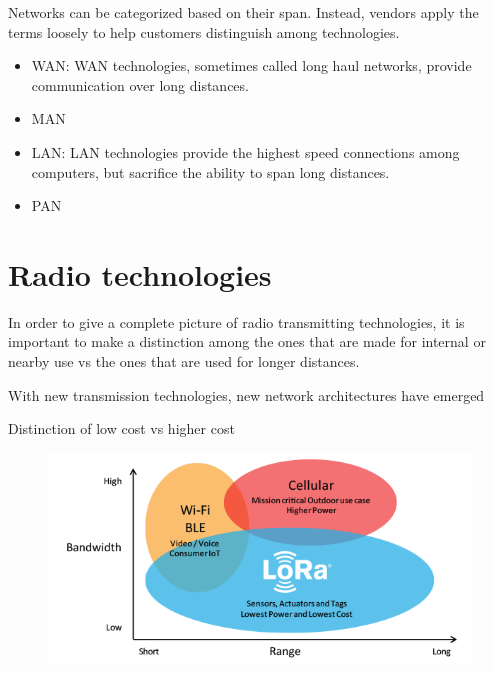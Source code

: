 	Networks can be categorized based on their span.
	Instead, vendors apply the terms loosely to help customers distinguish among technologies.
	\begin{itemize}
		\item WAN: WAN technologies, sometimes called long haul networks, provide communication
		over long distances.
		\item MAN
		\item LAN: 	LAN technologies provide the highest speed connections among computers, but
		sacrifice the ability to span long distances.
		\item PAN
	\end{itemize}
	
	
	\newpage	

\section{Radio technologies}\label{sec:section_two}
	
	In order to give a complete picture of radio transmitting technologies, it is important to make a distinction among the ones that are made for internal or nearby use vs the ones that are used for longer distances.
	
	
	With new transmission technologies, new network architectures have emerged
	
	
	Distinction of low cost vs higher cost
	
	\begin{figure}
		\centering
		\includegraphics[width=\textwidth]{resources/img/LoRa_Why_Range}
		\caption{}
	\end{figure}
	
